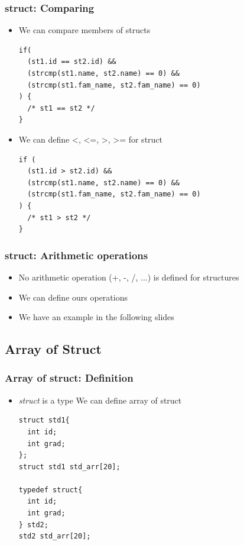 \documentclass{../c-lecture}
\begin{document}
\begin{frame}[fragile]
  \frametitle{struct: Comparing}
  \begin{itemize}
    \item We can compare members of structs
    \begin{verbatim}
if(
  (st1.id == st2.id) &&
  (strcmp(st1.name, st2.name) == 0) &&
  (strcmp(st1.fam_name, st2.fam_name) == 0)
) {
  /* st1 == st2 */
}
    \end{verbatim}
    \item We can define <, <=, >, >= for struct
    \begin{verbatim}
if (
  (st1.id > st2.id) &&
  (strcmp(st1.name, st2.name) == 0) &&
  (strcmp(st1.fam_name, st2.fam_name) == 0)
) {
  /* st1 > st2 */
}
    \end{verbatim}
  \end{itemize}
\end{frame}

\begin{frame}
  \frametitle{struct: Arithmetic operations}
  \begin{itemize}
    \item No arithmetic operation (+, -, /, ...) is defined for structures
    \item We can define ours operations
    \item We have an example in the following slides
  \end{itemize}
\end{frame}

\subsection{Array of Struct}

\begin{frame}[fragile]
  \frametitle{Array of struct: Definition}
  \begin{itemize}
    \item
      \textit{\color{Cyan} struct} is a type \textrightarrow We can define array
      of struct

    \begin{verbatim}
struct std1{
  int id;
  int grad;
};
struct std1 std_arr[20];

typedef struct{
  int id;
  int grad;
} std2;
std2 std_arr[20];
    \end{verbatim}
  \end{itemize}
\end{frame}
\end{document}
